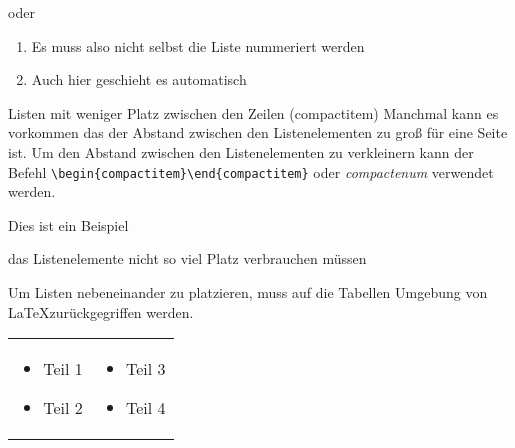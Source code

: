 oder 

\begin{enumerate}[{Beispiel} (a)]
	\item Es muss also nicht selbst die Liste nummeriert werden
	\item Auch hier geschieht es automatisch
\end{enumerate}

Listen mit weniger Platz zwischen den Zeilen (compactitem)
Manchmal kann es vorkommen das der Abstand zwischen den Listenelementen zu groß für eine Seite ist. Um den Abstand zwischen den Listenelementen zu verkleinern kann der Befehl \verb|\begin{compactitem}\end{compactitem}| oder \emph{compactenum} verwendet werden.
 
\begin{compactitem}
	\item Dies ist ein Beispiel
	\item das Listenelemente nicht so viel Platz verbrauchen müssen
\end{compactitem}

\vspace{1cm} %
Um Listen nebeneinander zu platzieren, muss auf die Tabellen Umgebung von \LaTeX zurückgegriffen werden. 

\begin{tabular}{ll}
	\parbox{5cm}{
		\begin{itemize}
			\item Teil 1
			\item Teil 2
	\end{itemize}}
	&
	\parbox{5cm}{
		\begin{itemize}
			\item Teil 3
			\item Teil 4
	\end{itemize}}
\end{tabular}